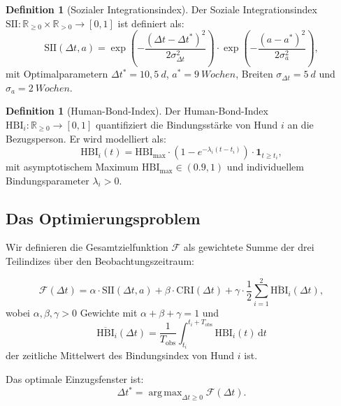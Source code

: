 ﻿\documentclass[12pt, a4paper]{article}
\theoremstyle{plain}
\theoremstyle{definition}
\newtheorem{definition}[theorem]{Definition}
\theoremstyle{remark}
\newcommand{\HBI}{\mathrm{HBI}}
\newcommand{\SII}{\mathrm{SII}}
\newcommand{\CRI}{\mathrm{CRI}}
\newcommand{\R}{\mathbb{R}}
\newcommand{\dt}{\Delta t}
\DeclareMathOperator*{\argmax}{arg\,max}
\begin{document}
\begin{definition}[Sozialer Integrationsindex]\label{def:sii}
Der Soziale Integrationsindex $\SII : \R_{\geq 0} \times \R_{>0} \to [0,1]$
ist definiert als:
\begin{equation}
  \SII(\dt, a) = \exp\!\left(-\frac{(\dt - \dt^*)^2}{2\sigma_{\dt}^2}\right)
                \cdot \exp\!\left(-\frac{(a - a^*)^2}{2\sigma_{a}^2}\right),
  \label{eq:sii}
\end{equation}
mit Optimalparametern $\dt^* = 10{,}5\ \si{d}$, $a^* = 9\ \si{Wochen}$,
Breiten $\sigma_{\dt} = 5\ \si{d}$ und $\sigma_a = 2\ \si{Wochen}$.
\end{definition}

\begin{definition}[Human-Bond-Index]\label{def:hbi}
Der Human-Bond-Index $\HBI_i : \R_{\geq 0} \to [0,1]$ quantifiziert die
Bindungsstärke von Hund $i$ an die Bezugsperson. Er wird modelliert als:
\begin{equation}
  \HBI_i(t) = \HBI_{\mathrm{max}} \cdot \left(1 - e^{-\lambda_i (t - t_i)}\right)
              \cdot \mathbf{1}_{t \geq t_i},
  \label{eq:hbi}
\end{equation}
mit asymptotischem Maximum $\HBI_{\mathrm{max}} \in (0.9, 1)$ und
individuellem Bindungsparameter $\lambda_i > 0$.
\end{definition}

\subsection{Das Optimierungsproblem}

Wir definieren die Gesamtzielfunktion $\mathcal{F}$ als gewichtete Summe der
drei Teilindizes über den Beobachtungszeitraum:

\begin{equation}
  \mathcal{F}(\dt) = \alpha \cdot \SII(\dt, a) + \beta \cdot \CRI(\dt)
                   + \gamma \cdot \frac{1}{2}\sum_{i=1}^{2} \overline{\HBI}_i(\dt),
  \label{eq:gesamtziel}
\end{equation}
wobei $\alpha, \beta, \gamma > 0$ Gewichte mit $\alpha + \beta + \gamma = 1$ und
\begin{equation}
  \overline{\HBI}_i(\dt) = \frac{1}{T_{\mathrm{obs}}} \int_{t_i}^{t_i + T_{\mathrm{obs}}} \HBI_i(t)\,\mathrm{d}t
\end{equation}
der zeitliche Mittelwert des Bindungsindex von Hund $i$ ist.

Das optimale Einzugsfenster ist:
\begin{equation}
  \dt^* = \argmax_{\dt \geq 0} \mathcal{F}(\dt).
  \label{eq:optimum}
\end{equation}
\end{document}
